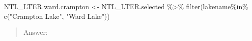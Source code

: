 \documentclass[
]{article}
\newenvironment{Shaded}{\begin{snugshade}}{\end{snugshade}}
\newcommand{\FunctionTok}[1]{\textcolor[rgb]{0.00,0.00,0.00}{#1}}
\newcommand{\NormalTok}[1]{#1}
\newcommand{\OtherTok}[1]{\textcolor[rgb]{0.56,0.35,0.01}{#1}}
\newcommand{\SpecialCharTok}[1]{\textcolor[rgb]{0.00,0.00,0.00}{#1}}
\newcommand{\StringTok}[1]{\textcolor[rgb]{0.31,0.60,0.02}{#1}}
\begin{document}
\begin{Shaded}
\begin{Highlighting}[]
\NormalTok{NTL\_LTER.ward.crampton }\OtherTok{\textless{}{-}}\NormalTok{ NTL\_LTER.selected }\SpecialCharTok{\%\textgreater{}\%}
  \FunctionTok{filter}\NormalTok{(lakename}\SpecialCharTok{\%in\%} \FunctionTok{c}\NormalTok{(}\StringTok{"Crampton Lake"}\NormalTok{, }\StringTok{"Ward Lake"}\NormalTok{))}
\end{Highlighting}
\end{Shaded}

\begin{quote}
Answer:
\end{quote}
\end{document}
